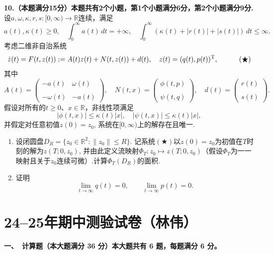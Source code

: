 \textbf{10.（本题满分15分）本题共有2个小题，第1个小题满分6分，第2个小题满分9分.}\\
设$a,\omega,\kappa, r, s:[0,\infty)\to \mathbb{R}$连续，满足
\[
    a(t),\kappa(t)\ge 0,\quad \int_0^{\infty}a(t)\,dt=+\infty,
    \quad\int_0^{\infty}(\kappa(t)+|r(t)|+|s(t)|)\,dt\le \infty.
\]
考虑二维非自治系统
\[
    \dot{z}(t)=F(t,z(t)):=A(t)z(t)+N(t,z(t))+d(t),\quad z(t)=(q(t),p(t))^{\rm T},\quad \tag{$\bigstar$}
\]
其中
\[
    A(t)=\begin{pmatrix}-a(t)&\omega(t)\\ \\-\omega(t)&-a(t)\end{pmatrix},
    \quad N(t,x)=\begin{pmatrix}\phi(t,p)\\ \\\psi(t,q)\end{pmatrix},
    \quad d(t)=\begin{pmatrix}r(t)\\ \\s(t)\end{pmatrix}.
\]
假设对所有的$t\ge 0$、$x\in\mathbb{R}$，非线性项满足
\[
    |\phi(t,x)|\le \kappa(t)|x|, \quad |\psi(t,x)|\le \kappa(t)|x|,
\]
并假定对任意初值$z(0)=z_0$, 系统在$[0,\infty)$上的解存在且唯一.
\begin{enumerate}
    \item[(1)]设闭圆盘$D_R=\{z_0\in \mathbb{R}^2:\|z_0\|\le R\}$. 
    记系统$(\bigstar)$以$z(0)=z_0$为初值在$T$时刻的解为$z(T;0,z_0)$, 
    并由此定义流映射$\Phi_T:z_0\mapsto z(T;0,z_0)$（假设$\Phi_T$为一一映射且关于$z_0$连续可微）.计算$\Phi_T(D_R)$的面积.
    \item[(2)]证明
    \[
        \lim_{t\to \infty}q(t)=0,\qquad \lim_{t\to \infty}p(t)=0.
    \]
\end{enumerate}

\section{24--25年期中测验试卷（林伟）}

\textbf{一、\ 计算题（本大题满分 36 分）本大题共有 6 题，每题满分 6 分。}

